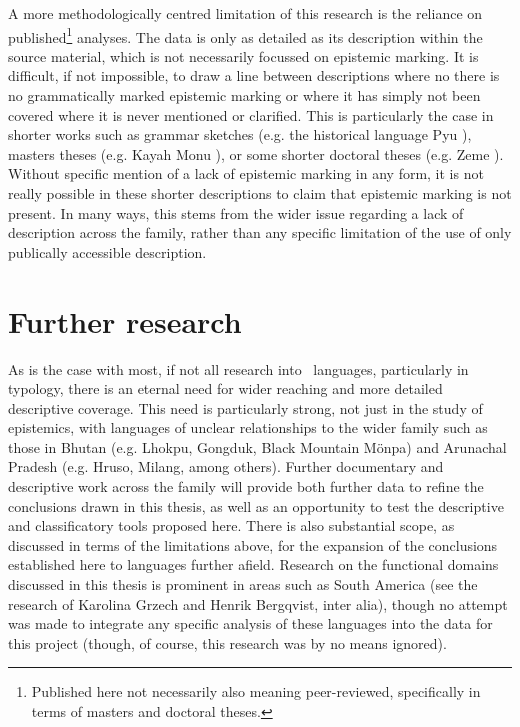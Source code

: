 A more methodologically centred limitation of this research is the reliance on published\footnote{Published here not necessarily also meaning peer-reviewed, specifically in terms of masters and doctoral theses.} analyses. The data is only as detailed as its description within the source material, which is not necessarily focussed on epistemic marking. It is difficult, if not impossible, to draw a line between descriptions where no there is no grammatically marked epistemic marking or where it has simply not been covered where it is never mentioned or clarified. This is particularly the case in shorter works such as grammar sketches (e.g. the historical language Pyu \cite[Subfamily Unclear: Myanmar][]{Miyake2019}), masters theses (e.g. Kayah Monu \cite[Karenic: Myanmar][]{Aung2013}), or some shorter doctoral theses (e.g. Zeme \cite[Zeme subfamily: India][]{Chanu2017}). Without specific mention of a lack of epistemic marking in any form, it is not really possible in these shorter descriptions to claim that epistemic marking is not present. In many ways, this stems from the wider issue regarding a lack of description across the family, rather than any specific limitation of the use of only publically accessible description.

\section{Further research}
As is the case with most, if not all research into \lfam\ languages, particularly in typology, there is an eternal need for wider reaching and more detailed descriptive coverage. This need is particularly strong, not just in the study of epistemics, with languages of unclear relationships to the wider family such as those in Bhutan (e.g. Lhokpu, Gongduk, Black Mountain Mönpa) and Arunachal Pradesh (e.g. Hruso, Milang, among others). Further documentary and descriptive work across the family will provide both further data to refine the conclusions drawn in this thesis, as well as an opportunity to test the descriptive and classificatory tools proposed here. There is also substantial scope, as discussed in terms of the limitations above, for the expansion of the conclusions established here to languages further afield. Research on the functional domains discussed in this thesis is prominent in areas such as South America (see the research of Karolina Grzech and Henrik Bergqvist, inter alia), though no attempt was made to integrate any specific analysis of these languages into the data for this project (though, of course, this research was by no means ignored).

